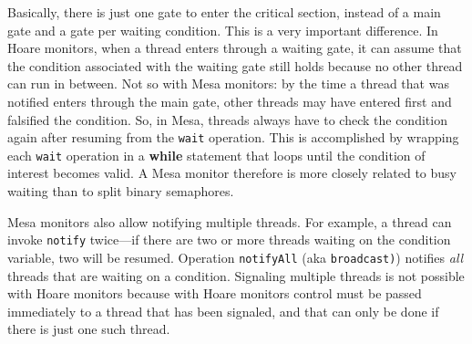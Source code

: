 \documentclass{report}
\begin{document}
{

Basically, there is just one gate to enter the critical section, instead
of a main gate and a gate per waiting condition.
This is a very important difference.  In Hoare monitors, when a thread
enters through a waiting gate, it can assume that the condition associated
with the waiting gate still holds because no other thread can run in between.
Not so with Mesa monitors: by the time a thread that was notified enters
through the main gate, other threads may have entered first and falsified
the condition.  So, in Mesa, threads always have to check the condition
again after resuming from the \texttt{wait} operation.  This is accomplished
by wrapping each \texttt{wait} operation in a \textbf{while} statement that
loops until the condition of interest becomes valid.
A Mesa monitor therefore is more closely related to busy waiting
than to split binary semaphores.

Mesa monitors also allow notifying multiple threads.
For example, a thread can invoke \texttt{notify} twice---if there are
two or more threads waiting on the condition variable, two will be resumed.
Operation \texttt{notifyAll}
%
(aka \texttt{broadcast)})
%
notifies \emph{all} threads that are waiting
on a condition.
Signaling multiple threads is not possible with Hoare monitors because with
Hoare monitors control
must be passed immediately to a thread that has been signaled, and that
can only be done if there is just one such thread.

}
\end{document}
